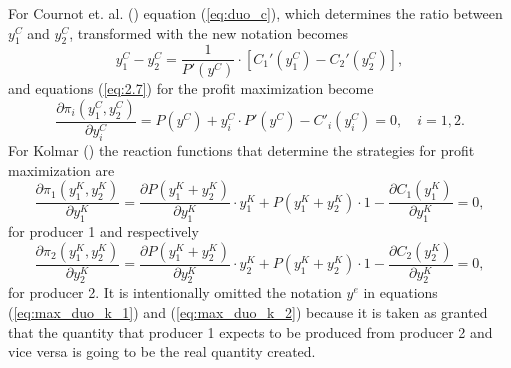 \documentclass[12pt]{article}
\numberwithin{equation}{subsection}
\begin{document}
For Cournot et. al. (\citeyear{cournot1897researches}) equation (\ref{eq:duo_c}), which determines the ratio between $y^C_1$ and $y^C_2$, transformed with the new notation becomes \begin{equation}
\label{eq:max_duo_new}
y^C_1 - y^C_2 = \frac{1}{P'(y^C)} \cdot \left[C_1'(y^C_1) - C_2'(y^C_2) \right],
\end{equation}
and equations (\ref{eq:2.7}) for the profit maximization become \begin{equation}
\label{eq:max_profit}
\frac{\partial \pi_i(y^C_1,y^C_2)}{\partial y^C_i} =P(y^C) + y^C_i \cdot P'(y^C) - C'_i(y^C_i) = 0, \quad i = 1,2.
\end{equation}
For Kolmar (\citeyear[p. 442]{Kolmar_2022}) the reaction functions that determine the strategies for profit maximization are \begin{equation}
\label{eq:max_duo_k_1}
\frac{\partial \pi_1(y^K_1,y^K_2)}{\partial y^K_1} = \frac{\partial P(y^K_1 + y^K_2)}{\partial y^K_1} \cdot y^K_1 + P(y^K_1 + y^K_2) \cdot 1 - \frac{\partial C_1(y^K_1)}{\partial y^K_1} = 0,
\end{equation} for producer 1 and respectively \begin{equation}
\label{eq:max_duo_k_2}
\frac{\partial \pi_2(y^K_1,y^K_2)}{\partial y^K_2} = \frac{\partial P(y^K_1 + y^K_2)}{\partial y^K_2} \cdot y^K_2 + P(y^K_1 + y^K_2) \cdot 1 - \frac{\partial C_2(y^K_2)}{\partial y^K_2} = 0,
\end{equation}
for producer 2. It is intentionally omitted the notation $y^e$ in equations (\ref{eq:max_duo_k_1}) and (\ref{eq:max_duo_k_2}) because it is taken as granted that the quantity that producer 1 expects to be produced from producer 2 and vice versa is going to be the real quantity created.
\end{document}
